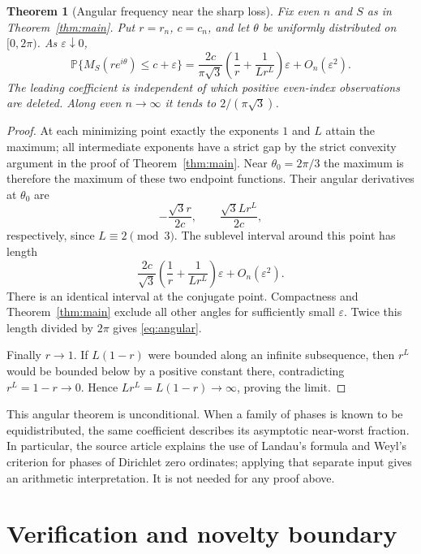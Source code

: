 \documentclass[11pt]{article}
\newtheorem{theorem}{Theorem}[section]
\begin{document}
\begin{theorem}[Angular frequency near the sharp loss]\label{thm:angular}
Fix even $n$ and $S$ as in Theorem~\ref{thm:main}. Put $r=r_n$, $c=c_n$, and let $\theta$ be uniformly distributed on $[0,2\pi)$. As $\varepsilon\downarrow0$,
\begin{equation}\label{eq:angular}
 \mathbb P\{M_S(r e^{i\theta})\le c+\varepsilon\}
 =\frac{2c}{\pi\sqrt3}\left(\frac1r+\frac1{Lr^L}\right)\varepsilon
 +O_n(\varepsilon^2).
\end{equation}
The leading coefficient is independent of which positive even-index observations are deleted. Along even $n\to\infty$ it tends to $2/(\pi\sqrt3)$.
\end{theorem}

\begin{proof}
At each minimizing point exactly the exponents $1$ and $L$ attain the maximum; all intermediate exponents have a strict gap by the strict convexity argument in the proof of Theorem~\ref{thm:main}. Near $\theta_0=2\pi/3$ the maximum is therefore the maximum of these two endpoint functions. Their angular derivatives at $\theta_0$ are
\[
 -\frac{\sqrt3 r}{2c},\qquad
 \frac{\sqrt3 Lr^L}{2c},
\]
respectively, since $L\equiv2\pmod3$. The sublevel interval around this point has length
\[
 \frac{2c}{\sqrt3}\left(\frac1r+\frac1{Lr^L}\right)\varepsilon
 +O_n(\varepsilon^2).
\]
There is an identical interval at the conjugate point. Compactness and Theorem~\ref{thm:main} exclude all other angles for sufficiently small $\varepsilon$. Twice this length divided by $2\pi$ gives \eqref{eq:angular}.

Finally $r\to1$. If $L(1-r)$ were bounded along an infinite subsequence, then $r^L$ would be bounded below by a positive constant there, contradicting $r^L=1-r\to0$. Hence $Lr^L=L(1-r)\to\infty$, proving the limit.
\end{proof}

This angular theorem is unconditional. When a family of phases is known to be equidistributed, the same coefficient describes its asymptotic near-worst fraction. In particular, the source article explains the use of Landau's formula and Weyl's criterion for phases of Dirichlet zero ordinates; applying that separate input gives an arithmetic interpretation. It is not needed for any proof above.

\section{Verification and novelty boundary}
\end{document}
